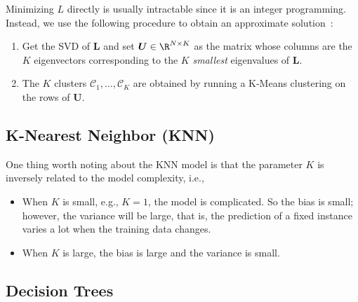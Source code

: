         Minimizing $L$ directly is usually intractable since it is an integer programming.
        Instead, we use the following procedure to obtain an approximate solution~\cite{shalev2014understanding}:
            \begin{enumerate}
                \item Get the SVD of $\bm{L}$ and set $\bm{U} \in \R^{\ndata \times K}$ as the matrix whose columns are the $K$ eigenvectors corresponding to the $K$ \emph{smallest} eigenvalues of $\bm{L}$.
                \item The $K$ clusters $\mathcal{C}_1,\ldots, \mathcal{C}_K$ are obtained by running a K-Means clustering on the rows of $\bm{U}$.
            \end{enumerate}
        
        
\subsection{K-Nearest Neighbor (KNN)}
One thing worth noting about the KNN model is that the parameter $K$ is inversely related to the model complexity, i.e., 
    \begin{itemize}
        \item When $K$ is small, e.g., $K=1$, the model is complicated. So the bias is small; however, the variance will be large, that is, the prediction of a fixed instance varies a lot when the training data changes. 
        \item When $K$ is large, the bias is large and the variance is small.
    \end{itemize}


\subsection{Decision Trees}
